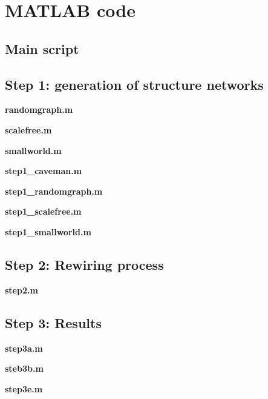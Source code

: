\section{MATLAB code}
\subsection{Main script}



\subsection{Step 1: generation of structure networks}

\textbf{randomgraph.m}


\textbf{scalefree.m}



\textbf{smallworld.m}



\textbf{step1\_caveman.m}



\textbf{step1\_randomgraph.m}



\textbf{step1\_scalefree.m}



\textbf{step1\_smallworld.m}



\subsection{Step 2: Rewiring process}

\textbf{step2.m}



\subsection{Step 3: Results}

\textbf{step3a.m}



\textbf{steb3b.m}



\textbf{step3e.m}



